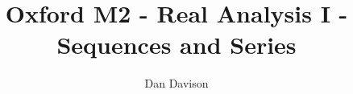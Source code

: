 \documentclass[12pt]{article}
\begin{document}
\title{Oxford M2 - Real Analysis I - Sequences and Series
  } \author{Dan Davison}
\author{}
\date{}
\maketitle



\end{document}
